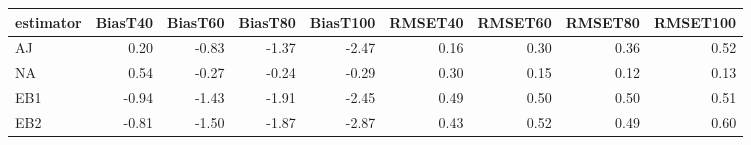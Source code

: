 \begin{table}[ht]
\centering
\begin{tabular}{lrrrrrrrr}
  \toprule
estimator & BiasT40 & BiasT60 & BiasT80 & BiasT100 & RMSET40 & RMSET60 & RMSET80 & RMSET100 \\ 
  \midrule
AJ & 0.20 & -0.83 & -1.37 & -2.47 & 0.16 & 0.30 & 0.36 & 0.52 \\ 
  NA & 0.54 & -0.27 & -0.24 & -0.29 & 0.30 & 0.15 & 0.12 & 0.13 \\ 
  EB1 & -0.94 & -1.43 & -1.91 & -2.45 & 0.49 & 0.50 & 0.50 & 0.51 \\ 
  EB2 & -0.81 & -1.50 & -1.87 & -2.87 & 0.43 & 0.52 & 0.49 & 0.60 \\ 
   \bottomrule
\end{tabular}
\end{table}
